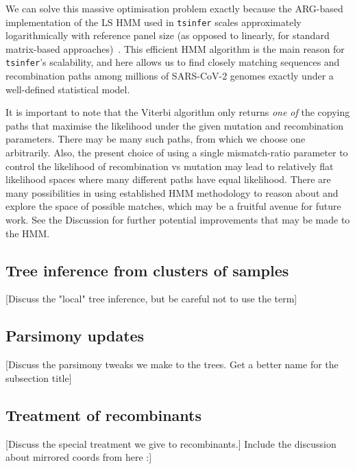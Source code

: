 \documentclass{article}
\begin{document}
We can solve this massive optimisation problem exactly because the ARG-based
implementation of the LS HMM used in \texttt{tsinfer} scales approximately
logarithmically with reference panel size (as opposed to linearly,
for standard matrix-based approaches)~\citep{Kelleher2019-ba}.
This efficient HMM algorithm is the main reason for \texttt{tsinfer}'s
scalability, and here allows us to find closely matching
sequences and recombination paths among millions of SARS-CoV-2
genomes exactly under a well-defined statistical model.

It is important to note that the Viterbi algorithm only returns
\emph{one of} the copying paths that maximise the likelihood under
 the given mutation and recombination parameters. There may be many
such paths, from which we choose one arbitrarily. Also, the
present choice of using a single mismatch-ratio parameter to control
the likelihood of recombination vs mutation may lead to relatively
flat likelihood spaces where many different paths have equal likelihood.
There are many possibilities in using established HMM methodology
to reason about and explore the space of possible matches, which may
be a fruitful avenue for future work. See the Discussion for further
potential improvements that may be made to the HMM.

\subsection{Tree inference from clusters of samples}
[Discuss the "local" tree inference, but be careful not to use the term]


\subsection{Parsimony updates}
[Discuss the parsimony tweaks we make to the trees. Get a better name
for the subsection title]

\subsection{Treatment of recombinants}
[Discuss the special treatment we give to recombinants.]
Include the discussion about mirrored coords from here :]

\end{document}
